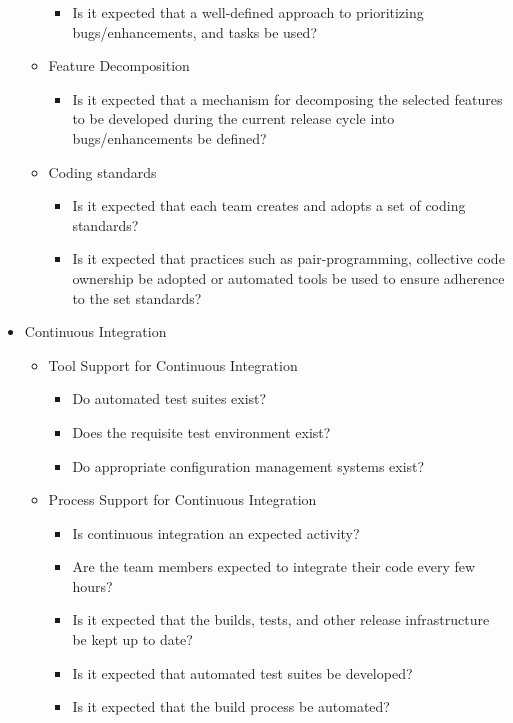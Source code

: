 \begin{itemize}
\begin{itemize}
				\begin{itemize}
					\item Is it expected that a well-defined approach to prioritizing bugs/enhancements, and tasks be used?
				\end{itemize}	
			\item Feature Decomposition
				\begin{itemize}
					\item Is it expected that a mechanism for decomposing the selected features to be developed during the current release cycle into bugs/enhancements be defined?
				\end{itemize}
			\item Coding standards
				\begin{itemize}
					\item Is it expected that each team creates and adopts a set of coding standards?
					\item Is it expected that practices such as pair-programming, collective code ownership be adopted or automated tools be used to ensure adherence to the set standards?
				\end{itemize}
		\end{itemize}
	\item Continuous Integration
		\begin{itemize}
			\item Tool Support for Continuous Integration
				\begin{itemize}
					\item Do automated test suites exist?
					\item Does the requisite test environment exist?
					\item Do appropriate configuration management systems exist?
				\end{itemize}
			\item Process Support for Continuous Integration
				\begin{itemize}
					\item Is continuous integration an expected activity?
					\item Are the team members expected to integrate their code every few hours?
					\item Is it expected that the builds, tests, and other release infrastructure be kept up to date?
					\item Is it expected that automated test suites be developed?
					\item Is it expected that the build process be automated?

\end{itemize}
\end{itemize}
\end{itemize}
